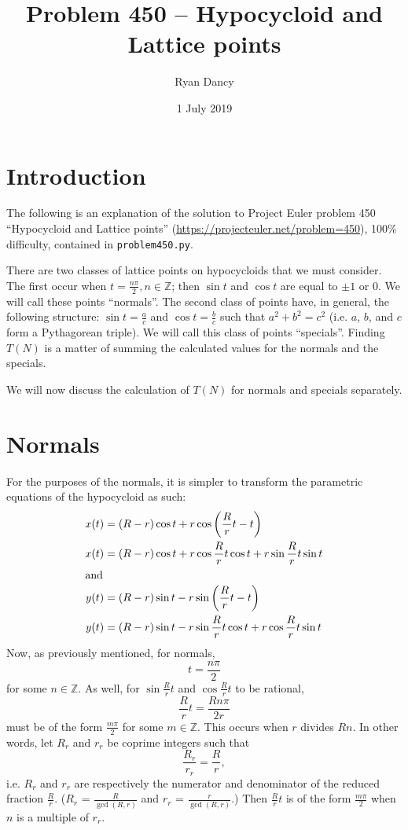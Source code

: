 \documentclass[12pt]{article}
\title{Problem 450 -- Hypocycloid and Lattice points}
\author{Ryan Dancy}
\date{1 July 2019}
\begin{document}
\maketitle

\section{Introduction}

The following is an explanation of the solution to Project Euler problem 450 ``Hypocycloid and Lattice points'' (\url{https://projecteuler.net/problem=450}), 100\% difficulty, contained in \texttt{problem450.py}.

There are two classes of lattice points on hypocycloids that we must consider. The first occur when $t = \frac{n\pi}{2}, n \in \mathbb{Z}$; then $\sin t$ and $\cos t$ are equal to $\pm 1$ or $0$. We will call these points ``normals''. The second class of points have, in general, the following structure: $\sin t = \frac{a}{c}$ and $\cos t = \frac{b}{c}$ such that $a^2 + b^2 = c^2$ (i.e. $a$, $b$, and $c$ form a Pythagorean triple). We will call this class of points ``specials''. Finding $T(N)$ is a matter of summing the calculated values for the normals and the specials.

We will now discuss the calculation of $T(N)$ for normals and specials separately.

\section{Normals}

For the purposes of the normals, it is simpler to transform the parametric equations of the hypocycloid as such:
\begin{align}
  x(t) &= (R - r)\cos t + r \cos\left(\frac{R}{r}t - t \right) \nonumber \\
  x(t) &= (R - r)\cos t + r \cos \frac{R}{r} t \cos t + r \sin \frac{R}{r} t \sin t \label{normalx} \\
  \intertext{and}
  y(t) &= (R - r)\sin t - r \sin\left(\frac{R}{r}t - t \right) \nonumber \\
  y(t)&= (R - r)\sin t - r \sin \frac{R}{r} t \cos t + r \cos \frac{R}{r} t \sin t \label{normaly}
\end{align}
Now, as previously mentioned, for normals, \[ t = \frac{n\pi}{2} \] for some $n \in \mathbb{Z}$.
As well, for $\sin\frac{R}{r}t$ and $\cos\frac{R}{r}t$ to be rational, \[ \frac{R}{r}t = \frac{Rn\pi}{2r} \] must be of the form $\frac{m\pi}{2}$ for some $m \in \mathbb{Z}$. This occurs when $r$ divides $Rn$.
In other words, let $R_r$ and $r_r$ be coprime integers such that \[ \frac{R_r}{r_r} = \frac{R}{r}, \] i.e. $R_r$ and $r_r$ are respectively the numerator and denominator of the reduced fraction $\frac{R}{r}$. ($R_r$ = $\frac{R}{\gcd(R, r)}$ and $r_r$ = $\frac{r}{\gcd(R, r)}$.) Then $\frac{R}{r} t$ is of the form $\frac{m\pi}{2}$ when $n$ is a multiple of $r_r$.
\end{document}
